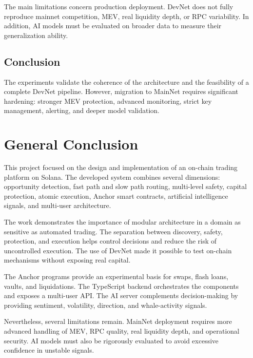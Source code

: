 \documentclass[12pt,a4paper]{report}
\begin{document}
The main limitations concern production deployment. DevNet does not fully reproduce mainnet competition, MEV, real liquidity depth, or RPC variability. In addition, AI models must be evaluated on broader data to measure their generalization ability.

\section{Conclusion}

The experiments validate the coherence of the architecture and the feasibility of a complete DevNet pipeline. However, migration to MainNet requires significant hardening: stronger MEV protection, advanced monitoring, strict key management, alerting, and deeper model validation.

\chapter*{General Conclusion}

This project focused on the design and implementation of an on-chain trading platform on Solana. The developed system combines several dimensions: opportunity detection, fast path and slow path routing, multi-level safety, capital protection, atomic execution, Anchor smart contracts, artificial intelligence signals, and multi-user architecture.

The work demonstrates the importance of modular architecture in a domain as sensitive as automated trading. The separation between discovery, safety, protection, and execution helps control decisions and reduce the risk of uncontrolled execution. The use of DevNet made it possible to test on-chain mechanisms without exposing real capital.

The Anchor programs provide an experimental basis for swaps, flash loans, vaults, and liquidations. The TypeScript backend orchestrates the components and exposes a multi-user API. The AI server complements decision-making by providing sentiment, volatility, direction, and whale-activity signals.

Nevertheless, several limitations remain. MainNet deployment requires more advanced handling of MEV, RPC quality, real liquidity depth, and operational security. AI models must also be rigorously evaluated to avoid excessive confidence in unstable signals.
\end{document}
